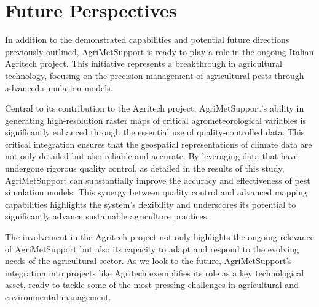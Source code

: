 \documentclass[authoryear,preprint,review,12pt]{elsarticle}
\newcommand{\note}[1]{\emph{\textcolor{red}{#1}}}
\begin{document}





\section*{Future Perspectives}
In addition to the demonstrated capabilities and potential future directions previously outlined, AgriMetSupport is ready to play a role in the ongoing Italian Agritech project. 
This initiative represents a breakthrough in agricultural technology, focusing on the precision management of agricultural pests through advanced simulation models.

Central to its contribution to the Agritech project, AgriMetSupport's ability in generating high-resolution raster maps of critical agrometeorological variables is significantly enhanced through the essential use of quality-controlled data.
This critical integration ensures that the geospatial representations of climate data are not only detailed but also reliable and accurate. 
By leveraging data that have undergone rigorous quality control, as detailed in the results of this study, AgriMetSupport can substantially improve the accuracy and effectiveness of pest simulation models. 
This synergy between quality control and advanced mapping capabilities highlights the system's flexibility and underscores its potential to significantly advance sustainable agriculture practices.

The involvement in the Agritech project not only highlights the ongoing relevance of AgriMetSupport but also its capacity to adapt and respond to the evolving needs of the agricultural sector. 
As we look to the future, AgriMetSupport's integration into projects like Agritech exemplifies its role as a key technological asset, ready to tackle some of the most pressing challenges in agricultural and environmental management.
\end{document}
